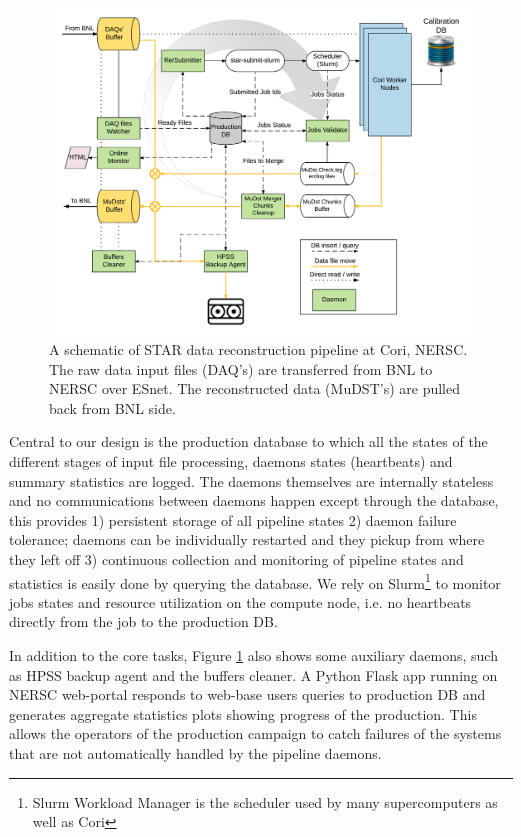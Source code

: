 \documentclass[a4paper]{jpconf}
\begin{document}
\begin{figure}[h]
\begin{center}
\includegraphics[width=\textwidth]{STAR_at_Cori_Data_Flow_Diagram}
\end{center}
  \caption{\label{pipeline}A schematic of STAR data reconstruction pipeline at Cori, NERSC. 
  The raw data input files (DAQ's) are transferred from BNL to NERSC over ESnet. The reconstructed data (MuDST's) 
  are pulled back from BNL side.}
\end{figure}

Central to our design is the production database to which all the states of the
different stages of input file processing, daemons states (heartbeats) and
summary statistics are logged. The daemons themselves are internally stateless
and no communications between daemons happen except through the database, this
provides 1) persistent storage of all pipeline states 2) daemon failure
tolerance; daemons can be individually restarted and they pickup from where
they left off 3) continuous collection and monitoring of pipeline states and
statistics is easily done by querying the database. We rely on
Slurm\footnote{Slurm Workload Manager is the scheduler used by many supercomputers as well as Cori} \cite{slurm} to
monitor jobs states and resource utilization on the compute node, i.e. no
heartbeats directly from the job to the production DB.

In addition to the core tasks, Figure \ref{pipeline} also shows some auxiliary
daemons, such as HPSS backup agent and the buffers cleaner. A Python Flask app
running on NERSC web-portal responds to web-base users queries to production DB 
and generates aggregate statistics plots showing progress of the production.
This allows the operators of the production campaign to catch failures of the
systems that are not automatically handled by the pipeline daemons.
\end{document}
